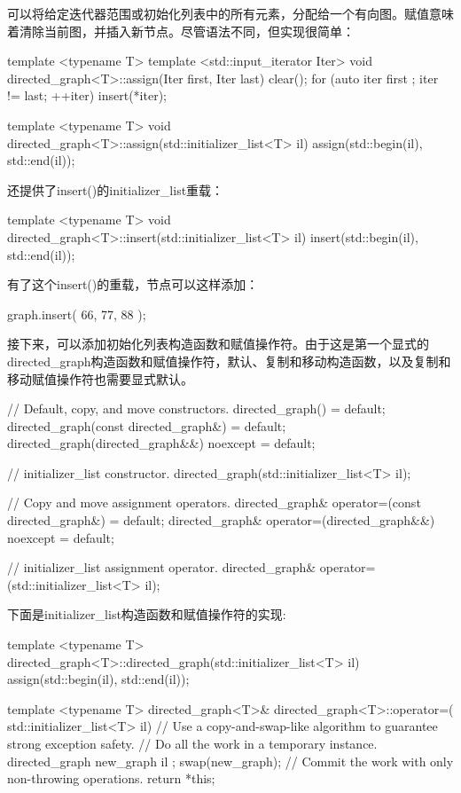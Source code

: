 可以将给定迭代器范围或初始化列表中的所有元素，分配给一个有向图。赋值意味着清除当前图，并插入新节点。尽管语法不同，但实现很简单：

\begin{cpp}
template <typename T>
template <std::input_iterator Iter>
void directed_graph<T>::assign(Iter first, Iter last)
{
    clear();
    for (auto iter { first }; iter != last; ++iter) { insert(*iter); }
}

template <typename T>
void directed_graph<T>::assign(std::initializer_list<T> il)
{
    assign(std::begin(il), std::end(il));
}
\end{cpp}

还提供了insert()的initializer\_list重载：

\begin{cpp}
template <typename T>
void directed_graph<T>::insert(std::initializer_list<T> il)
{
    insert(std::begin(il), std::end(il));
}
\end{cpp}

有了这个insert()的重载，节点可以这样添加：

\begin{cpp}
graph.insert({ 66, 77, 88 });
\end{cpp}

接下来，可以添加初始化列表构造函数和赋值操作符。由于这是第一个显式的directed\_graph构造函数和赋值操作符，默认、复制和移动构造函数，以及复制和移动赋值操作符也需要显式默认。

\begin{cpp}
// Default, copy, and move constructors.
directed_graph() = default;
directed_graph(const directed_graph&) = default;
directed_graph(directed_graph&&) noexcept = default;

// initializer_list constructor.
directed_graph(std::initializer_list<T> il);

// Copy and move assignment operators.
directed_graph& operator=(const directed_graph&) = default;
directed_graph& operator=(directed_graph&&) noexcept = default;

// initializer_list assignment operator.
directed_graph& operator=(std::initializer_list<T> il);
\end{cpp}

下面是initializer\_list构造函数和赋值操作符的实现:

\begin{cpp}
template <typename T>
directed_graph<T>::directed_graph(std::initializer_list<T> il)
{
    assign(std::begin(il), std::end(il));
}

template <typename T>
directed_graph<T>& directed_graph<T>::operator=(
    std::initializer_list<T> il)
{
    // Use a copy-and-swap-like algorithm to guarantee strong exception safety.
    // Do all the work in a temporary instance.
    directed_graph new_graph { il };
    swap(new_graph); // Commit the work with only non-throwing operations.
    return *this;
}
\end{cpp}

